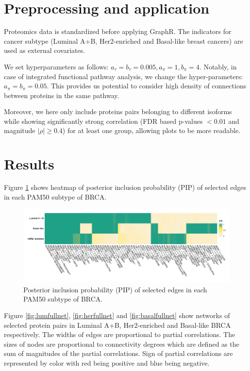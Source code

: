 \documentclass[
]{book}
\begin{document}
\hypertarget{PAM50process}{%
\section{Preprocessing and application}\label{PAM50process}}

Proteomics data is standardized before applying GraphR. The indicators for cancer subtype (Luminal A+B, Her2-enriched and Basal-like breast cancers) are used as external covariates.

We set hyperparameters as follows: \(a_\tau = b_\tau = 0.005,a_\pi = 1,b_\pi=4\). Notably, in case of integrated functional pathway analysis, we change the hyper-parameters: \(a_\pi = b_\pi = 0.05\). This provides us potential to consider high density of connections between proteins in the same pathway.

Moreover, we here only include proteins pairs belonging to different isoforms while showing significantly strong correlation (FDR based p-values \(<0.01\) and magnitude \(\mid \rho \mid \geq 0.4\)) for at least one group, allowing plots to be more readable.

\hypertarget{PAM50result}{%
\section{Results}\label{PAM50result}}

Figure \ref{fig:pampip} shows heatmap of posterior inclusion probability (PIP) of selected edges in each PAM50 subtype of BRCA.

\begin{figure}

{\centering \includegraphics[width=0.95\linewidth]{images/subtype_pip} 

}

\caption{Posterior inclusion probability (PIP) of selected edges in each PAM50 subtype of BRCA.}\label{fig:pampip}
\end{figure}

Figure \ref{fig:lumfullnet}, \ref{fig:herfullnet} and \ref{fig:basalfullnet} show networks of selected protein pairs in Luminal A+B, Her2-enriched and Basal-like BRCA respectively. The widths of edges are proportional to partial correlations. The sizes of nodes are proportional to connectivity degrees which are defined as the sum of magnitudes of the partial correlations. Sign of partial correlations are represented by color with red being positive and blue being negative.
\end{document}
